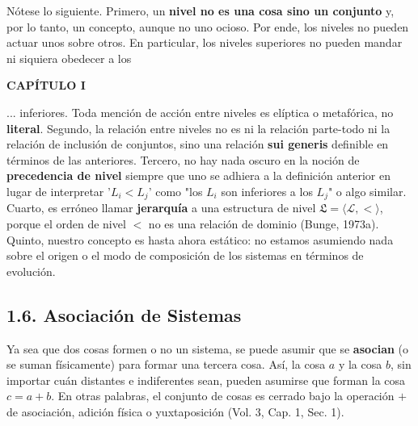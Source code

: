{Nótese lo siguiente. Primero, un \textbf{nivel no es una cosa sino un conjunto} y, por lo tanto, un concepto, aunque no uno ocioso. Por ende, los niveles no pueden actuar unos sobre otros. En particular, los niveles superiores no pueden mandar ni siquiera obedecer a los
}
\newpage
\fancyhf{}
\fancyhead[L]{\thepage} 
\begin{center}
{\fontsize{13}{16}\selectfont \textbf{CAPÍTULO I}}
\end{center}
\vspace{0.5cm}

{\fontsize{13}{15}\selectfont
... inferiores. Toda mención de acción entre niveles es elíptica o metafórica, no \textbf{literal}. Segundo, la relación entre niveles no es ni la relación parte-todo ni la relación de inclusión de conjuntos, sino una relación \textbf{sui generis} definible en términos de las anteriores. Tercero, no hay nada oscuro en la noción de \textbf{precedencia de nivel} siempre que uno se adhiera a la definición anterior en lugar de interpretar '$L_i < L_j$' como "los $L_i$ son inferiores a los $L_j$" o algo similar. Cuarto, es erróneo llamar \textbf{jerarquía} a una estructura de nivel $\mathfrak{L} = \langle \mathcal{L}, < \rangle$, porque el orden de nivel $<$ no es una relación de dominio (Bunge, 1973a). Quinto, nuestro concepto es hasta ahora estático: no estamos asumiendo nada sobre el origen o el modo de composición de los sistemas en términos de evolución.

\subsection*{1.6. Asociación de Sistemas}
Ya sea que dos cosas formen o no un sistema, se puede asumir que se \textbf{asocian} (o se suman físicamente) para formar una tercera cosa. Así, la cosa $a$ y la cosa $b$, sin importar cuán distantes e indiferentes sean, pueden asumirse que forman la cosa $c = a + b$. En otras palabras, el conjunto de cosas es cerrado bajo la operación $+$ de asociación, adición física o yuxtaposición (Vol. 3, Cap. 1, Sec. 1).

}
